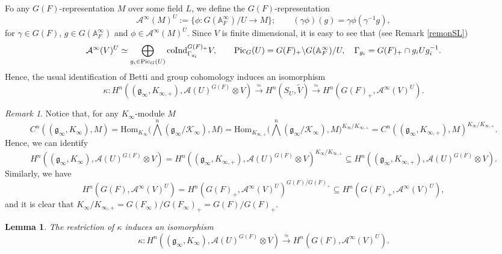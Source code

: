 \documentclass{amsart}
\newtheorem{lemma}[theorem]{Lemma}
\theoremstyle{definition}
\theoremstyle{remark}
\newtheorem{remark}[theorem]{Remark}
\numberwithin{equation}{section}
\newcommand{\Pic}{\mathrm{Pic}}
\newcommand{\A}{{\mathbb A}}
\newcommand{\cA}{{\mathcal A}}
\newcommand{\cK}{{\mathcal K}}
\newcommand{\mfg}{{\mathfrak g}}
\newcommand{\Hom}{{\mathrm {Hom}}}
\begin{document}
Fo any $G(F)$-representation $M$ over some field $L$, we define the $G(F)$-representation  
\[
\cA^{\infty}(M)^U:=\{\phi: G(\A_F^{\infty})/U\longrightarrow M\};\qquad (\gamma\phi)(g)=\gamma\phi(\gamma^{-1}g),
\]
for $\gamma\in G(F)$, $g\in G(\A_F^\infty)$ and $\phi\in \cA^{\infty}(M)^U$.
Since $V$ is finite dimensional, it is easy to see that (see Remark \ref{remonSL}) 
\[
\cA^{\infty}(V)^U\simeq \bigoplus_{g_i\in\Pic_G(U)}{\rm coInd}_{\Gamma_{g_i}}^{G(F)_+}V,\qquad \Pic_G(U)=G(F)_+\backslash G(\A_F^\infty)/U, \quad \Gamma_{g_i}=G(F)_+\cap g_i Ug_i^{-1}.
\]
Hence, the usual identification of Betti and group cohomology induces an isomorphism
\begin{equation}\label{isoGKBetti}
    \kappa: H^n((\mfg_\infty,K_{\infty,+}),\cA(U)^{G(F)}\otimes V)\stackrel{\simeq}{\longrightarrow} H^n(S_U,\tilde V)\stackrel{\simeq}{\longrightarrow}H^n(G(F)_+,\cA^\infty(V)^U).
\end{equation}
\begin{remark}
Notice that, for any $K_\infty$-module $M$
\[
C^n((\mfg_\infty,K_{\infty}),M)=\Hom_{K_{\infty}}\big(\bigwedge^n(\mfg_\infty/\cK_\infty),M\big)=\Hom_{K_{\infty,+}}\big(\bigwedge^n(\mfg_\infty/\cK_\infty),M\big)^{K_\infty/K_{\infty,+}}=
C^n((\mfg_\infty,K_{\infty,+}),M)^{K_\infty/K_{\infty,+}}.
\]
Hence, we can identify 
\[
H^n((\mfg_\infty,K_{\infty}),\cA(U)^{G(F)}\otimes V)=H^n((\mfg_\infty,K_{\infty,+}),\cA(U)^{G(F)}\otimes V)^{K_\infty/K_{\infty,+}}\subseteq H^n((\mfg_\infty,K_{\infty,+}),\cA(U)^{G(F)}\otimes V).
\]
Similarly, we have 
\[
H^n(G(F),\cA^\infty(V)^U)=H^n(G(F)_+,\cA^\infty(V)^U)^{G(F)/G(F)_+}\subseteq H^n(G(F)_+,\cA^\infty(V)^U),
\]
and it is clear that $K_\infty/K_{\infty,+}=G(F_\infty)/G(F_\infty)_+=G(F)/G(F)_+$.
\end{remark}
\begin{lemma}\label{lemmaisoGKBetti}
    The restriction of $\kappa$ induces an isomorphism 
    \[
    \kappa: H^n((\mfg_\infty,K_{\infty}),\cA(U)^{G(F)}\otimes V)\stackrel{\simeq}{\longrightarrow} H^n(G(F),\cA^\infty(V)^U).
    \]
\end{lemma}
\end{document}
